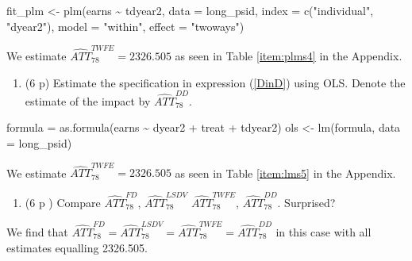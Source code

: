 \documentclass[
]{article}
\newenvironment{Shaded}{\begin{snugshade}}{\end{snugshade}}
\newcommand{\AttributeTok}[1]{\textcolor[rgb]{0.77,0.63,0.00}{#1}}
\newcommand{\FunctionTok}[1]{\textcolor[rgb]{0.00,0.00,0.00}{#1}}
\newcommand{\NormalTok}[1]{#1}
\newcommand{\OtherTok}[1]{\textcolor[rgb]{0.56,0.35,0.01}{#1}}
\newcommand{\SpecialCharTok}[1]{\textcolor[rgb]{0.00,0.00,0.00}{#1}}
\newcommand{\StringTok}[1]{\textcolor[rgb]{0.31,0.60,0.02}{#1}}
\providecommand{\tightlist}{%
  \setlength{\itemsep}{0pt}\setlength{\parskip}{0pt}}
\begin{document}
\begin{Shaded}
\begin{Highlighting}[]
\NormalTok{fit\_plm }\OtherTok{\textless{}{-}} \FunctionTok{plm}\NormalTok{(earns }\SpecialCharTok{\textasciitilde{}}\NormalTok{ tdyear2, }
               \AttributeTok{data =}\NormalTok{ long\_psid, }
               \AttributeTok{index =} \FunctionTok{c}\NormalTok{(}\StringTok{"individual"}\NormalTok{, }\StringTok{"dyear2"}\NormalTok{), }
               \AttributeTok{model =} \StringTok{"within"}\NormalTok{, }
               \AttributeTok{effect =} \StringTok{"twoways"}\NormalTok{)}
\end{Highlighting}
\end{Shaded}

We estimate \(\widehat{ATT}_{78}^{TWFE} = 2326.505\) as seen in Table
\ref{item:plms4} in the Appendix.

\begin{enumerate}
\def\labelenumi{\arabic{enumi}.}
\setcounter{enumi}{4}
\tightlist
\item
  (6 p) Estimate the specification in expression (\ref{DinD}) using OLS.
  Denote the estimate of the impact by
  \(\widehat{ATT}_{78}^{DD}\).\label{item:dd}
\end{enumerate}

\begin{Shaded}
\begin{Highlighting}[]
\NormalTok{formula }\OtherTok{=} \FunctionTok{as.formula}\NormalTok{(earns }\SpecialCharTok{\textasciitilde{}}\NormalTok{ dyear2 }\SpecialCharTok{+}\NormalTok{ treat }\SpecialCharTok{+}\NormalTok{ tdyear2)}
\NormalTok{ols }\OtherTok{\textless{}{-}} \FunctionTok{lm}\NormalTok{(formula, }\AttributeTok{data =}\NormalTok{ long\_psid)}
\end{Highlighting}
\end{Shaded}

We estimate \(\widehat{ATT}_{78}^{TWFE} = 2326.505\) as seen in Table
\ref{item:lms5} in the Appendix.

\begin{enumerate}
\def\labelenumi{\arabic{enumi}.}
\setcounter{enumi}{5}
\tightlist
\item
  (6 p ) Compare \(\widehat{ATT}_{78}^{FD}\),
  \(\widehat{ATT}_{78}^{LSDV}\) \(\widehat{ATT}_{78}^{TWFE}\),
  \(\widehat{ATT}_{78}^{DD}\). Surprised?
\end{enumerate}

We find that
\(\widehat{ATT}_{78}^{FD} = \widehat{ATT}_{78}^{LSDV} = \widehat{ATT}_{78}^{TWFE} = \widehat{ATT}_{78}^{DD}\)
in this case with all estimates equalling 2326.505.
\end{document}
